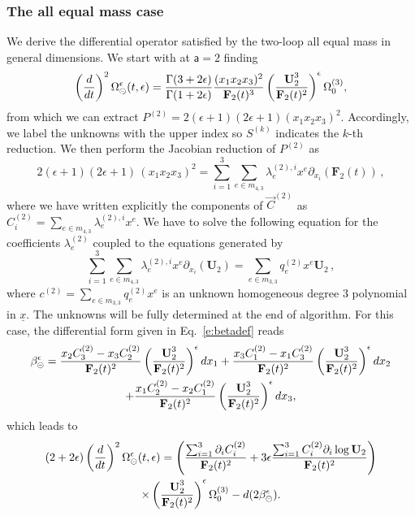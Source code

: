 \documentclass[a4paper,12pt]{article}
\numberwithin{equation}{section}
\numberwithin{figure}{section}
\def\su{\circleddash}
\begin{document}
\subsubsection{The all equal mass case}\label{sec:2sunset1mass}
We derive the differential  operator satisfied by the two-loop all
equal mass in general dimensions. 
We  start with at $\mathsf{a}=2$ finding
\begin{equation}
 \left(d\over dt\right)^2
 \Omega_{\su}^{\epsilon}(t,\epsilon)={\Gamma(3+2\epsilon)\over\Gamma(1+2\epsilon)} {(x_1x_2x_3)^2\over \textbf{F}_2(t)^3}
 \left(\textbf{U}_2^3\over \textbf{F}_2(t)^2\right)^\epsilon  \Omega_0^{(3)} ,
\end{equation}
from which we can extract $P^{(2)}=2 (\epsilon +1) (2 \epsilon +1)(x_1x_2x_3)^2$. 
%
Accordingly, we label the unknowns with the upper index so $S^{(k)}$ indicates the $k$-th reduction. We then  perform the Jacobian reduction of $P^{(2)}$ as
\begin{equation}\label{e:reduc}
  2 (\epsilon +1) (2 \epsilon +1)\,  (x_1x_2x_3)^2= \sum_{i=1}^3 
  \sum_{e\in m_{4,3}}\lambda^{(2),i}_{e} x^e \partial_{x_i}  (\mathbf{F}_2(t)) \,,
\end{equation}
%
where we have written explicitly the components of $\vec{C}^{(2)}$ as $C^{(2)}_i=\sum_{e\in m_{4,3}}\lambda^{(2),i}_{e} x^e$.
We have to solve the following equation for the coefficients $\lambda_e^{(2)}$ coupled to the equations generated by
\begin{equation}\label{e:C2red}
\sum_{i=1}^3 
\sum_{e\in m_{4,3}}\lambda^{(2),i}_{e} x^e \partial_{x_i}(\mathbf U_2) = \sum_{e\in m_{3,3}} q^{(2)}_e x^e \textbf{U}_2 \,, 
%
\end{equation}
where $c^{(2)}=\sum_{e\in m_{3,3}} q^{(2)}_e x^e$ is an unknown homogeneous degree 3 polynomial
in $\underline x$.
%
The unknowns will be fully determined at the end of  algorithm. For this case, 
the differential form given in Eq.~\eqref{e:betadef} reads
%
 \begin{multline}
 	\label{eq:beta-equalmass-sunset}
   \beta_\su^\epsilon=   {x_2  C_3^{(2)}-x_3  C_2^{(2)}\over
     \textbf{F}_2(t)^2} \left(\textbf{U}_2^3\over \textbf{F}_2(t)^2\right)^\epsilon dx_1+   {x_3  C_1^{(2)}-x_1 C_3^{(2)}\over
     \textbf{F}_2(t)^2} \left(\textbf{U}_2^3\over \textbf{F}_2(t)^2\right)^\epsilon dx_2\cr
   +  {x_1  C_2^{(2)}-x_2  C_1^{(2)}\over
    \textbf{F}_2(t)^2} \left(\textbf{U}_2^3\over \textbf{F}_2(t)^2\right)^\epsilon dx_3, 
 \end{multline}
which leads to 
%
\begin{multline}
 (2+2\epsilon)\left(d\over dt\right)^2
  \Omega_{\su}^{\epsilon}(t,\epsilon)=
 \left({\sum_{i=1}^3 \partial_i C_i^{(2)}\over
     \textbf{F}_2(t)^{2}}+3\epsilon{\sum_{i=1}^3 C_i^{(2)}\partial_i
     \log \textbf{U}_2\over \textbf{F}_2(t)^{2}}\right)\cr \times\left(\textbf{U}_2^3\over \textbf{F}_2(t)^2\right)^\epsilon \Omega_0^{(3)}-d(2\beta_\su^\epsilon).
\end{multline}
\end{document}
